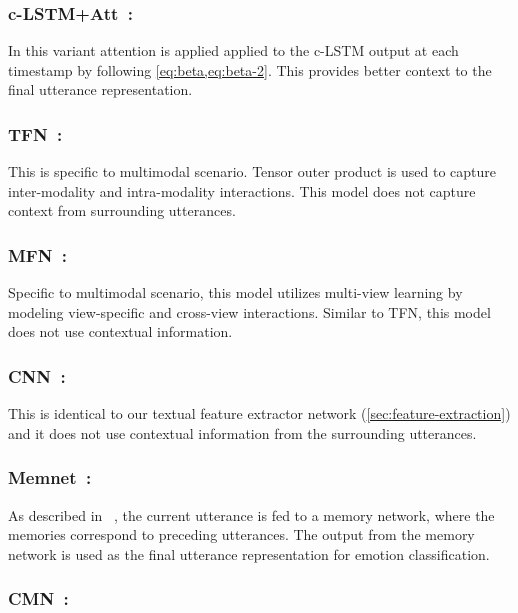 \documentclass[letterpaper]{article} %
\newcommand{\citet}[1]
{\citeauthor{#1}~\shortcite{#1}}
\begin{document}
\subsubsection{c-LSTM+Att~\cite{poria-EtAl:2017:Long}:}

In this variant attention is applied applied to the c-LSTM output at each timestamp by following
\cref{eq:beta,eq:beta-2}. This provides better context to the final utterance representation.

\subsubsection{TFN~\cite{zadeh-EtAl:2017:EMNLP2017}:}

This is specific to multimodal scenario.
Tensor outer product is used to capture inter-modality and intra-modality
interactions. This model does not capture context from surrounding utterances.

\subsubsection{MFN~\cite{AAAI1817341}:}

Specific to multimodal scenario, this model utilizes multi-view learning by modeling view-specific and cross-view interactions. Similar to TFN, this model does not use contextual information.

\subsubsection{CNN~\cite{kim2014convolutional}:}
This is identical to our textual feature extractor network (\cref{sec:feature-extraction}) and it does not use contextual information from the surrounding utterances. %

\subsubsection{Memnet~\cite{Sukhbaatar:2015:EMN:2969442.2969512}:}

As described in \citet{hazarika-EtAl:2018:N18-1}, the current utterance is fed to a
memory network, where the memories correspond to preceding utterances.
The output from the memory network is used as the final utterance representation for
emotion classification.

\subsubsection{CMN~\cite{hazarika-EtAl:2018:N18-1}:}
\end{document}
